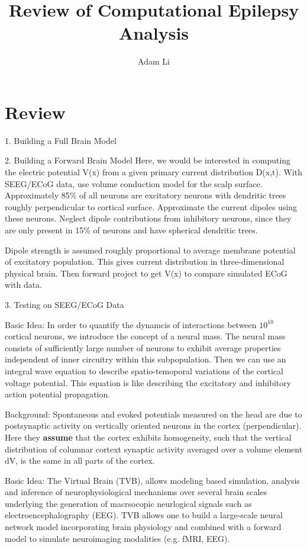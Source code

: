 \documentclass{article}
\title{Review of Computational Epilepsy Analysis}
\author{Adam Li}
\begin{document}
\section{Review}

1. Building a Full Brain Model

2. Building a Forward Brain Model
Here, we would be interested in computing the electric potential V(x) from a given primary current distribution D(x,t). With SEEG/ECoG data, use volume conduction model for the scalp surface. Approximately 85\% of all neurons are excitatory neurons with dendritic trees roughly perpendicular to cortical surface. Approximate the current dipoles using these neurons. Neglect dipole contributions from inhibitory neurons, since they are only present in 15\% of neurons and have spherical dendritic trees.

Dipole strength is assumed roughly proportional to average membrane potential of excitatory population. This gives current distribution in three-dimensional physical brain. Then forward project to get V(x) to compare simulated ECoG with data.

3. Testing on SEEG/ECoG Data

\cite{Nunez1974}
Basic Idea: In order to quantify the dynamcis of interactions between $10^{10}$ cortical neurons, we introduce the concept of a neural mass. The neural mass consists of sufficiently large number of neurons to exhibit average properties independent of inner circuitry within this subpopulation. Then we can use an integral wave equation to describe spatio-temoporal variations of the cortical voltage potential. This equation is like describing the excitatory and inhibitory action potential propagation.

Background: Spontaneous and evoked potentials measured on the head are due to postsynaptic activity on vertically oriented neurons in the cortex (perpendicular). Here they \textbf{assume} that the cortex exhibits homogeneity, such that the vertical distribution of columnar cortext synaptic activity averaged over a volume element dV, is the same in all parts of the cortex. 


\cite{Ritter2013}
Basic Idea:
The Virtual Brain (TVB), allows modeling based simulation, analysis and inference of neurophysiological mechanisms over several brain scales underlying the generation of macrsocopic neurlogical signals such as electroencephalography (EEG). TVB allows one to build a large-scale neural network model incorporating brain physiology and combined with a forward model to simulate neuroimaging modalities (e.g. fMRI, EEG).
\end{document}
